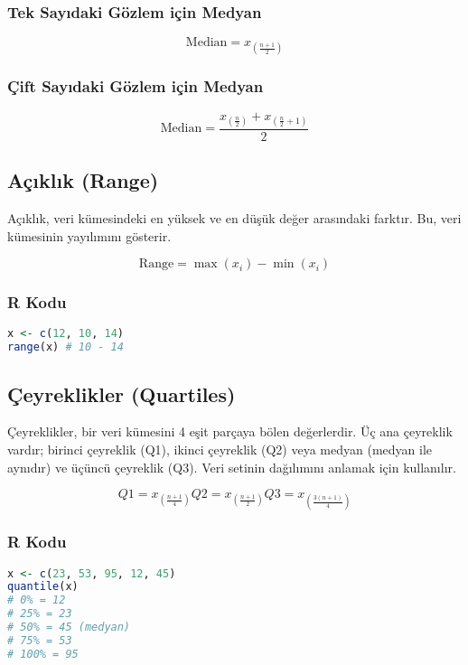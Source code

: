 \subsubsection{Tek Sayıdaki Gözlem için Medyan}

\[
\text{Median} = x_{\left(\frac{n+1}{2}\right)}
\]

\subsubsection{Çift Sayıdaki Gözlem için Medyan}

\[
\text{Median} = \frac{x_{\left(\frac{n}{2}\right)} + x_{\left(\frac{n}{2}+1\right)}}{2}
\]

\newpage

\subsection{Açıklık (Range)}
Açıklık, veri kümesindeki en yüksek ve en düşük değer arasındaki farktır. Bu, veri kümesinin yayılımını gösterir.

\[
\text{Range} = \max(x_i) - \min(x_i)
\]

\subsubsection{R Kodu}

\begin{lstlisting}[language=R]
x <- c(12, 10, 14)
range(x) # 10 - 14
\end{lstlisting}

\newpage

\subsection{Çeyreklikler (Quartiles)}
Çeyreklikler, bir veri kümesini 4 eşit parçaya bölen değerlerdir. Üç ana çeyreklik vardır; birinci çeyreklik (Q1), ikinci çeyreklik (Q2) veya medyan (medyan ile aynıdır) ve üçüncü çeyreklik (Q3). Veri setinin dağılımını anlamak için kullanılır.

\[
Q1 = x_{\left(\frac{n+1}{4}\right)}
Q2 = x_{\left(\frac{n+1}{2}\right)}
Q3 = x_{\left(\frac{3(n+1)}{4}\right)}
\]

\subsubsection{R Kodu}

\begin{lstlisting}[language=R]
x <- c(23, 53, 95, 12, 45)
quantile(x)
# 0% = 12
# 25% = 23
# 50% = 45 (medyan)
# 75% = 53
# 100% = 95
\end{lstlisting}

